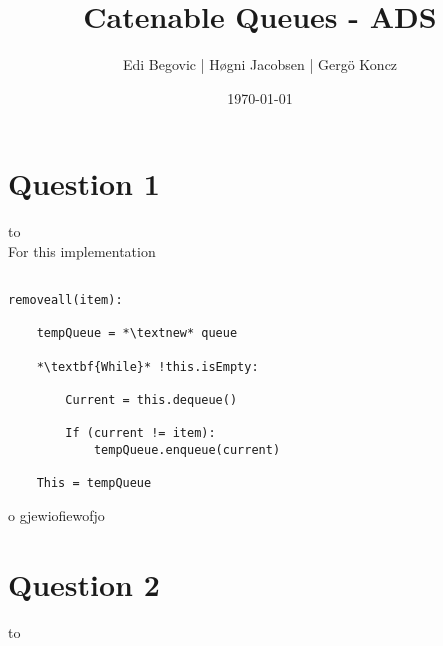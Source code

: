 \documentclass[a4paper]{article}
\title{Catenable Queues - ADS}
\author{Edi Begovic | Høgni Jacobsen | Gergö Koncz}
\date{\today}
\def\headline#1{\hbox to \hsize{\hrulefill\quad\lower.3em\hbox{#1}\quad\hrulefill}}
\begin{document}
 
\maketitle

\section*{Question 1}
\headline{-} \ \\

\noindent
For this implementation 

\begin{lstlisting}[escapeinside={{*}{*}}]

removeall(item):

    tempQueue = *\textnew* queue

    *\textbf{While}* !this.isEmpty:

        Current = this.dequeue()
        
        If (current != item):
            tempQueue.enqueue(current)
    
    This = tempQueue

\end{lstlisting}
o gjewiofiewofjo


\section*{Question 2}
\headline{-} \ \\
\end{document}
